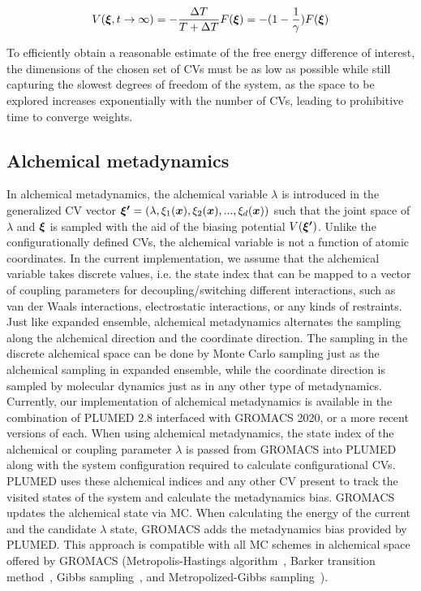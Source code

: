 \documentclass[journal=jacsat,manuscript=article]{achemso}
\newcommand{\bfv}[1]{{\mbox{\boldmath{$#1$}}}}
\newcommand{\x}{\bfv{x}}
\begin{document}
\begin{equation}
    V(\bfv{\xi}, t \rightarrow \infty)=-\frac{\Delta T}{T + \Delta T}F(\bfv{\xi})=-(1-\frac{1}{\gamma})F(\bfv{\xi})
\end{equation}

To efficiently obtain a reasonable estimate of the free energy difference of interest, the dimensions of the chosen set of CVs must be as low as possible while still capturing the slowest degrees of freedom of the system, as the space to be explored increases exponentially with the number of CVs, leading to prohibitive time to converge weights. 

\subsection{Alchemical metadynamics}
In alchemical metadynamics, the alchemical variable $\lambda$ is introduced in the generalized CV vector $\bfv{\xi'}=(\lambda, \xi_{1}(\x), \xi_{2}(\x), ..., \xi_{d}(\x))$ such that the joint space of $\lambda$ and $\bfv{\xi}$ is sampled with the aid of the biasing potential $V(\bfv{\xi'})$. Unlike the configurationally defined CVs, the alchemical variable is not a function of atomic coordinates. In the current implementation, we assume that the alchemical variable takes discrete values, i.e. the state index that can be mapped to a vector of coupling parameters for decoupling/switching different interactions, such as van der Waals interactions, electrostatic interactions, or any kinds of restraints. Just like expanded ensemble, alchemical metadynamics alternates the sampling along the alchemical direction and the coordinate direction. The sampling in the discrete alchemical space can be done by Monte Carlo sampling just as the alchemical sampling in expanded ensemble, while the coordinate direction is sampled by molecular dynamics just as in any other type of metadynamics. Currently, our implementation of alchemical metadynamics is available in the combination of PLUMED 2.8 interfaced with GROMACS 2020, or a more recent versions of each. When using alchemical metadynamics, the state index of the alchemical or coupling parameter $\lambda$ is passed from GROMACS into PLUMED along with the system configuration required to calculate configurational CVs. PLUMED uses these alchemical indices and any other CV present to track the visited states of the system and calculate the metadynamics bias. GROMACS updates the alchemical state via MC. When calculating the energy of the current and the candidate $\lambda$ state, GROMACS adds the metadynamics bias provided by PLUMED. This approach is compatible with all MC schemes in alchemical space offered by GROMACS (Metropolis-Hastings algorithm~\cite{hastings1970monte}, Barker transition method~\cite{barker1965monte}, Gibbs sampling~\cite{geman1984stochastic, liu2001monte}, and Metropolized-Gibbs sampling~\cite{liu1996peskun, chodera2016simple}).
\end{document}

